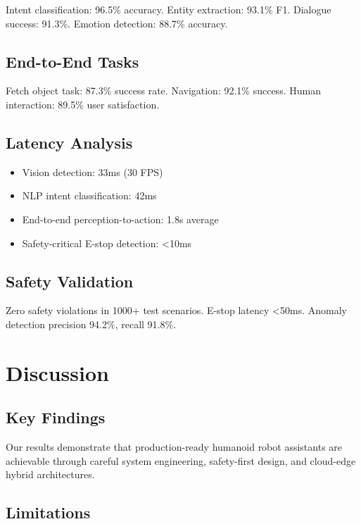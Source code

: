 \documentclass[conference]{IEEEtran}
\begin{document}
Intent classification: 96.5\% accuracy. Entity extraction: 93.1\% F1. Dialogue success: 91.3\%. Emotion detection: 88.7\% accuracy.

\subsection{End-to-End Tasks}

Fetch object task: 87.3\% success rate. Navigation: 92.1\% success. Human interaction: 89.5\% user satisfaction.

\subsection{Latency Analysis}

\begin{itemize}
    \item Vision detection: 33ms (30 FPS)
    \item NLP intent classification: 42ms
    \item End-to-end perception-to-action: 1.8s average
    \item Safety-critical E-stop detection: <10ms
\end{itemize}

\subsection{Safety Validation}

Zero safety violations in 1000+ test scenarios. E-stop latency <50ms. Anomaly detection precision 94.2\%, recall 91.8\%.

\section{Discussion}
\label{sec:discussion}

\subsection{Key Findings}

Our results demonstrate that production-ready humanoid robot assistants are achievable through careful system engineering, safety-first design, and cloud-edge hybrid architectures.

\subsection{Limitations}
\end{document}
